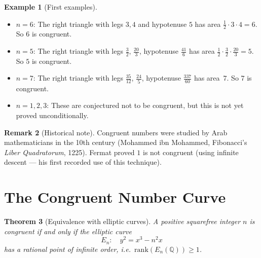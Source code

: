 \documentclass[12pt,a4paper]{amsart}
\newtheorem{theorem}{Theorem}[section]
\theoremstyle{definition}
\newtheorem{remark}[theorem]{Remark}
\newtheorem{example}[theorem]{Example}
\newcommand{\Q}{\mathbb{Q}}
\begin{document}
\begin{example}[First examples]
\begin{itemize}
  \item $n = 6$: The right triangle with legs $3, 4$ and hypotenuse $5$
    has area $\tfrac{1}{2} \cdot 3 \cdot 4 = 6$.  So $6$ is congruent.
  \item $n = 5$: The right triangle with legs $\tfrac{3}{2}$, $\tfrac{20}{3}$,
    hypotenuse $\tfrac{41}{6}$ has area $\tfrac{1}{2}\cdot\tfrac{3}{2}\cdot\tfrac{20}{3} = 5$.
    So $5$ is congruent.
  \item $n = 7$: The right triangle with legs $\tfrac{35}{12}$,
    $\tfrac{24}{5}$, hypotenuse $\tfrac{337}{60}$ has area~$7$.
    So $7$ is congruent.
  \item $n = 1, 2, 3$: These are conjectured not to be congruent,
    but this is not yet proved unconditionally.
\end{itemize}
\end{example}

\begin{remark}[Historical note]
Congruent numbers were studied by Arab mathematicians in the 10th century
(Mohammed ibn Mohammed, Fibonacci's \emph{Liber Quadratorum}, 1225).
Fermat proved $1$ is not congruent (using infinite descent --- his first
recorded use of this technique).
\end{remark}

\section{The Congruent Number Curve}

\begin{theorem}[Equivalence with elliptic curves]
\label{thm:equiv}
A positive squarefree integer $n$ is congruent if and only if the elliptic curve
\[
  E_n: \quad y^2 = x^3 - n^2 x
\]
has a rational point of infinite order, i.e.\ $\mathrm{rank}(E_n(\Q)) \ge 1$.
\end{theorem}
\end{document}
